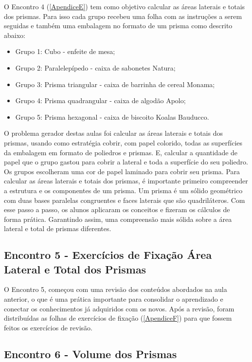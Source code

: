 O Encontro 4 (\autoref{ApendiceE}) tem como objetivo calcular as áreas laterais e totais dos prismas. Para isso cada grupo recebeu uma folha com as instruções a serem seguidas e também uma embalagem no formato de um prisma como descrito abaixo:

\begin{itemize}
    \item Grupo 1: Cubo - enfeite de mesa;
    \item Grupo 2: Paralelepípedo - caixa de sabonetes Natura;
    \item Grupo 3: Prisma triangular - caixa de barrinha de cereal Monama;
    \item Grupo 4: Prisma quadrangular - caixa de algodão Apolo;
    \item Grupo 5: Prisma hexagonal - caixa de biscoito Koalas Bauducco.
\end{itemize}

O problema gerador destas aulas foi calcular as áreas laterais e totais dos prismas, usando como estratégia cobrir, com papel colorido, todas as superfícies da embalagem em formato de poliedros e prismas. E, calcular a quantidade de papel que o grupo gastou para cobrir a lateral e toda a superfície do seu poliedro. Os grupos escolheram uma cor de papel laminado para cobrir seu prisma. Para calcular as áreas laterais e totais dos prismas, é importante primeiro compreender a estrutura e os componentes de um prisma. Um prisma é um sólido geométrico com duas bases paralelas congruentes e faces laterais que são quadriláteros. Com esse passo a passo, os alunos aplicaram os conceitos e fizeram os cálculos de forma prática. Garantindo assim, uma compreensão mais sólida sobre a área lateral e total de prismas diferentes.

\subsection{Encontro 5 - Exercícios de Fixação Área Lateral e Total dos Prismas}

O Encontro 5, começou com uma revisão dos conteúdos abordados na aula anterior, o que é uma prática importante para consolidar o aprendizado e conectar os conhecimentos já adquiridos com os novos. Após a revisão, foram distribuídas as folhas de exercícios de fixação (\autoref{ApendiceF}) para que fossem feitos os exercícios de revisão.

\subsection{Encontro 6 - Volume dos Prismas}

